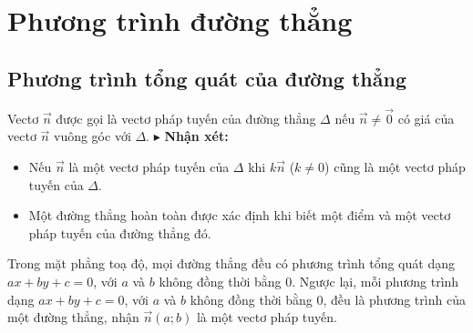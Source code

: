 \documentclass[12pt,a4paper]{extarticle}
\begin{document}
\onehalfspacing

\makeheadbox[headerright={Tổng ôn 10-11},chude={CHỦ ĐỀ 04},tieude={Oxy, ba đường conic},dinhdang={Hình học},lop={12 },gv={Nguyễn Lê Minh Ngọc}]

\vspace{2em}
\section{Phương trình đường thẳng}
\subsection{Phương trình tổng quát của đường thẳng}
\begin{minipage}{0.65\textwidth}
Vectơ $\vec{n}$ được gọi là vectơ pháp tuyến của đường thẳng $\Delta$ nếu $\vec{n} \ne \vec{0}$ có giá của vectơ $\vec{n}$ vuông góc với $\Delta$.
\smallskip
\textcolor{book}{$\blacktriangleright$} \textbf{Nhận xét:}
\begin{itemize}
    \item Nếu $\vec{n}$ là một vectơ pháp tuyến của $\Delta$ khi $k\vec{n}$ ($k \ne 0$) cũng là một vectơ pháp tuyến của $\Delta$.
    \item Một đường thẳng hoàn toàn được xác định khi biết một điểm và một vectơ pháp tuyến của đường thẳng đó.
\end{itemize}
\end{minipage}
\hfill
\begin{minipage}{0.3\textwidth}
\centering
{}
\end{minipage}
\vspace{0.5cm}
\begin{minipage}{0.65\textwidth}
Trong mặt phẳng toạ độ, mọi đường thẳng đều có \textcolor{book}{phương trình tổng quát} dạng \textcolor{book}{$ax + by + c = 0$}, với $a$ và $b$ không đồng thời bằng $0$. Ngược lại, mỗi phương trình dạng $ax + by + c = 0$, với $a$ và $b$ không đồng thời bằng $0$, đều là phương trình của một đường thẳng, nhận \textcolor{book}{$\vec{n}(a; b)$} là một \textcolor{book}{vectơ pháp tuyến}.
\end{minipage}
\end{document}

